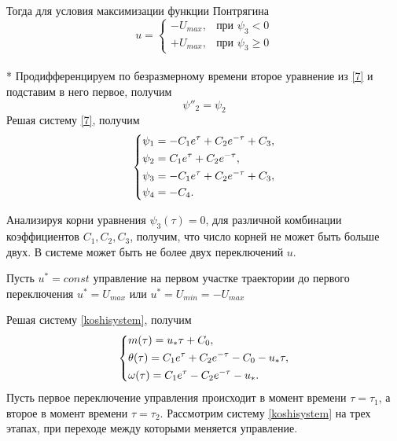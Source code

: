 \documentclass[a4paper,14pt]{article}
\theoremstyle{plain} %
\theoremstyle{definition} %
\theoremstyle{remark} %
\begin{document}
{Тогда для условия максимизации функции Понтрягина
\[
    u=
    \begin{cases}
        -U_{max}, & \text{при $\psi_3<0$}    \\
        +U_{max}, & \text{при $\psi_3\geq0$}
    \end{cases}
\]\\*
Продифференцируем по безразмерному времени второе уравнение из \eqref{7} и подставим в него первое, получим
\[
    \psi{''}_2=\psi_2
\]
Решая систему \eqref{7}, получим
\begin{equation}\label{psisystem}
    \left\{ {\begin{aligned}
                 & \psi_1 = -C_1e^\tau+C_2e^{-\tau}+C_3, \hfill  \\
                 & \psi_2 = C_1e^\tau+C_2e^{-\tau} , \hfill      \\
                 & \psi_3 = -C_1e^\tau+C_2e^{-\tau}+C_3 , \hfill \\
                 & \psi_4 = -C_4 . \hfill                        \\
            \end{aligned}} \right.
\end{equation}

Анализируя корни уравнения $\psi_3(\tau)=0$, для различной комбинации
коэффициентов $C_1,C_2,C_3$, получим, что число корней не может быть больше двух. В системе может быть не более двух переключений $u$.

Пусть $u^*=const$ управление на первом участке траектории до первого переключения $u^*=U_{max}$ или $u^*=U_{min}=-U_{max}$

Решая систему \eqref{koshisystem}, получим
\begin{equation}\label{solvekoshi}
    \left\{ {\begin{aligned}
                 & m(\tau) = u_*\tau+C_0, \hfill                              \\
                 & \theta(\tau) = C_1e^\tau+C_2e^{-\tau}-C_0-u_*\tau , \hfill \\
                 & \omega(\tau) = C_1e^\tau-C_2e^{-\tau}-u_*  . \hfill        \\
            \end{aligned}} \right.
\end{equation}
Пусть первое переключение управления происходит в момент времени
$\tau=\tau_1$, а второе в момент времени
$\tau=\tau_2$. Рассмотрим систему \eqref{koshisystem} на трех этапах,
при переходе между которыми меняется управление.

}
\end{document}
